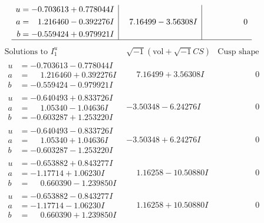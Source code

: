 \documentclass[1p]{elsarticle_modified}
\theoremstyle{definition}
\newcommand{\I}{\sqrt{-1}}
\begin{document}
$$\begin{array}{c|c|c}
\begin{aligned}
u &= -0.703613 + 0.778044 I \\
a &= \phantom{-}1.216460 - 0.392276 I \\
b &= -0.559424 + 0.979921 I\end{aligned}
 & \phantom{-}7.16499 - 3.56308 I & \phantom{-0.000000 } 0\\
 \hline 
 \end{array}$$\newpage$$\begin{array}{c|c|c}  
\text{Solutions to }I^u_{1}& \I (\text{vol} + \sqrt{-1}CS) & \text{Cusp shape}\\
 \hline 
\begin{aligned}
u &= -0.703613 - 0.778044 I \\
a &= \phantom{-}1.216460 + 0.392276 I \\
b &= -0.559424 - 0.979921 I\end{aligned}
 & \phantom{-}7.16499 + 3.56308 I & \phantom{-0.000000 } 0 \\ \hline\begin{aligned}
u &= -0.640493 + 0.833726 I \\
a &= \phantom{-}1.05340 - 1.04636 I \\
b &= -0.603287 + 1.253220 I\end{aligned}
 & -3.50348 - 6.24276 I & \phantom{-0.000000 } 0 \\ \hline\begin{aligned}
u &= -0.640493 - 0.833726 I \\
a &= \phantom{-}1.05340 + 1.04636 I \\
b &= -0.603287 - 1.253220 I\end{aligned}
 & -3.50348 + 6.24276 I & \phantom{-0.000000 } 0 \\ \hline\begin{aligned}
u &= -0.653882 + 0.843277 I \\
a &= -1.17714 + 1.06230 I \\
b &= \phantom{-}0.660390 - 1.239850 I\end{aligned}
 & \phantom{-}1.16258 - 10.50880 I & \phantom{-0.000000 } 0 \\ \hline\begin{aligned}
u &= -0.653882 - 0.843277 I \\
a &= -1.17714 - 1.06230 I \\
b &= \phantom{-}0.660390 + 1.239850 I\end{aligned}
 & \phantom{-}1.16258 + 10.50880 I & \phantom{-0.000000 } 0 \\ \hline\begin{aligned}

\end{aligned}
\end{array}$$
\end{document}
